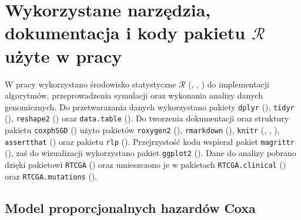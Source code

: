 \chapter{Wykorzystane narzędzia, dokumentacja i kody pakietu $\mathcal{R}$ użyte w pracy}\label{docCoxSGD}

W pracy wykorzystano środowisko statystyczne $\mathcal{R}$ (\cite{programikr}, \cite{biecek1}, \cite{gagol1}) do implementacji algorytmów, przeprowadzenia symulacji oraz wykonania analizy danych genomicznych. Do przetwarazania danych wykorzystano pakiety \texttt{dplyr} (\cite{dplyr}), \texttt{tidyr} (\cite{tidyr}), \texttt{reshape2} (\cite{reshape2}) oraz \texttt{data.table} (\cite{data.table}). Do tworzenia dokumentacji oraz struktury pakietu \texttt{coxphSGD} (\cite{kosa0}) użyto pakietów \texttt{roxygen2} (\cite{roxygen2}), \texttt{rmarkdown} (\cite{rmarkdown}), \texttt{knitr} (\cite{knitr1}, \cite{knitr2}, \cite{knitr3}), \texttt{assertthat} (\cite{assertthat}) oraz pakietu \texttt{rlp} (\cite{rlp}). Przejrzystość kodu wspierał pakiet \texttt{magrittr} (\cite{magrittr}), zaś do wizualizacji wykorzystano pakiet \texttt{ggplot2} (\cite{ggplot2}). Dane do analizy pobrano dzięki pakietowi \texttt{RTCGA} (\cite{kosa1}) oraz umieszczono je w pakietach \texttt{RTCGA.clinical} (\cite{kosa2}) oraz \texttt{RTCGA.mutations} (\cite{kosa3}). 

\section{Model proporcjonalnych hazardów Coxa}\label{coxKody123}

